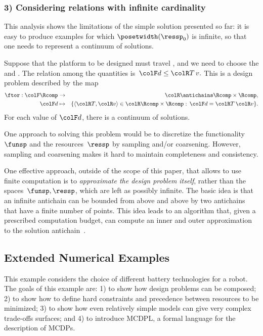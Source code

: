  

\subsubsection{3) Considering relations with infinite cardinality}

This analysis shows the limitations of the simple solution presented
so far: it is easy to produce examples for which $\posetwidth(\ressp_{0})$
is infinite, so that one needs to represent a continuum of solutions.

\begin{example}
Suppose that the platform to be designed must travel , and we need to choose the 
and . The relation among the quantities
is~${\colF d}\leq{\colR T\,v}.$ This is a design problem described
by the map
\begin{eqnarray*}
\ftor:{\colF\Rcomp} & \rightarrow & {\colR\antichains\Rcomp\times\Rcomp,}\\
{\colF d} & \mapsto & \{\langle{\colR T},{\colR v}\rangle\in{\colR\Rcomp\times\Rcomp}:\,{\colF d}={\colR T}\,{\colR v}\}.
\end{eqnarray*}
For each value of ${\colF d}$, there is a continuum of solutions.
\end{example}
One approach to solving this problem would be to discretize the functionality~$\funsp$
and the resources~$\ressp$ by sampling and/or coarsening. However,
sampling and coarsening makes it hard to maintain completeness and
consistency. 

One effective approach, outside of the scope of this paper, that allows
to use finite computation is to \emph{approximate the design problem}
\emph{itself}, rather than the spaces~$\funsp,\ressp$, which are
left as possibly infinite. The basic idea is that an infinite antichain
can be bounded from above and above by two antichains that have a
finite number of points. This idea leads to an algorithm that, given
a prescribed computation budget, can compute an inner and outer approximation
to the solution antichain~\cite{mcdp_icra_uncertainty_arxiv}.



\subsection{Extended Numerical Examples\label{sec:Numerical-examples}}

This example considers the choice of different battery technologies
for a robot. The goals of this example are: 1) to show how design
problems can be composed; 2) to show how to define hard constraints
and precedence between resources to be minimized; 3) to show how even
relatively simple models can give very complex trade-offs surfaces;
and 4) to introduce MCDPL, a formal language for the description of
MCDPs.


